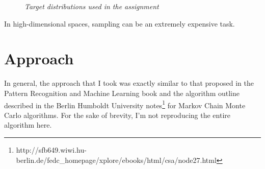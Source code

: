 \documentclass{article} %
\begin{document}
\begin{figure}[h]%
	\centering
    	\hfill%
    \caption{\textit{Target distributions used in the assignment}}
    \label{fig:default}
\end{figure}

In high-dimensional spaces, sampling can be an extremely expensive task.

\section{Approach}

In general, the approach that I took was exactly similar to that proposed in the Pattern Recognition and Machine Learning book and the algorithm outline described in the Berlin Humboldt University notes\footnote{http://sfb649.wiwi.hu-berlin.de/fedc\_homepage/xplore/ebooks/html/csa/node27.html} for Markov Chain Monte Carlo algorithms. For the sake of brevity, I'm not reproducing the entire algorithm here.
\end{document}
